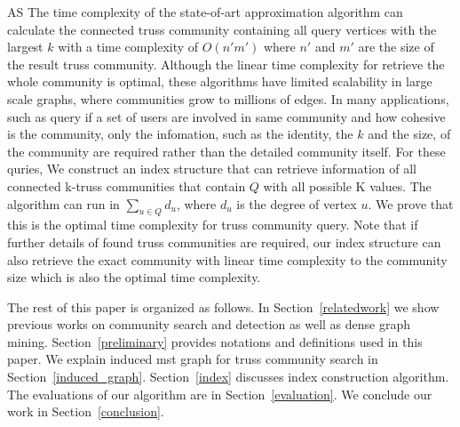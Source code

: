 AS The time complexity of the state-of-art approximation algorithm can calculate the connected truss community containing all query vertices with the largest $k$ with a time complexity of $O(n'm')$ where $n'$ and $m'$ are the size of the result truss community. Although the linear time complexity for retrieve the whole community is optimal, these algorithms have limited scalability in large scale graphs, where communities grow to millions of edges. In many applications, such as query if a set of users are involved in same community and how cohesive is the community, only the infomation, such as the identity, the $k$ and the size, of the community are required rather than the detailed community itself. For these quries, We construct an index structure that can retrieve information of all connected k-truss communities that contain $Q$ with all possible K values. The algorithm can run in $\sum_{u \in Q} d_u$, where $d_u$ is the degree of vertex $u$. We prove that this is the optimal time complexity for truss community query. Note that if further details of found truss communities are required, our index structure can also retrieve the exact community with linear time complexity to the community size which is also the optimal time complexity.

The rest of this paper is organized as follows. In Section~\ref{relatedwork} we show previous works on community search and detection as well as dense graph mining. Section~\ref{preliminary} provides notations and definitions used in this paper. We explain induced mst graph for truss community search in Section~\ref{induced_graph}. Section~\ref{index} discusses index construction algorithm. The evaluations of our algorithm are in Section~\ref{evaluation}. We conclude our work in Section~\ref{conclusion}.
